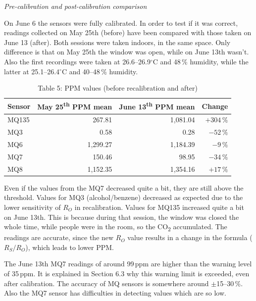 \textit{Pre-calibration and post-calibration comparison}

On June 6 the sensors were fully calibrated. In order to test if it was correct, readings
collected on May 25th (before) have been compared with those taken on June 13 (after). Both
sessions were taken indoors, in the same space. Only difference is that on May 25th the window
was open, while on June 13th wasn't. Also the first recordings were taken at 26.6--26.9$^\circ$C
and 48\,\% humidity, while the latter at 25.1--26.4$^\circ$C and 40--48\,\% humidity.

\vspace{12pt}
\begin{table}[H]
  \centering
  \caption{Table 5: PPM values (before recalibration and after)}
  \label{tab:calibration-compare}
  \renewcommand{\arraystretch}{1.3}
  \begin{tabular}{lrrr}
    \toprule
    \textbf{Sensor} & \textbf{May 25\textsuperscript{th} PPM mean} & \textbf{June 13\textsuperscript{th} PPM mean} & \textbf{Change} \\
    \midrule
    MQ135 &    267.81 & 1{,}081.04 & $+304\,\%$ \\
    MQ3   &      0.58 &      0.28  & $-52\,\%$  \\
    MQ6   & 1{,}299.27 & 1{,}184.39 & $-9\,\%$  \\
    MQ7   &    150.46 &     98.95  & $-34\,\%$  \\
    MQ8   & 1{,}152.35 & 1{,}354.16 & $+17\,\%$ \\
    \bottomrule
  \end{tabular}
\end{table}
\vspace{12pt}

Even if the values from the MQ7 decreased quite a bit, they are still above the threshold.
Values for MQ3 (alcohol/benzene) decreased as expected due to the lower sensitivity of $R_O$
in recalibration. Values for MQ135 increased quite a bit on June 13th. This is because during
that session, the window was closed the whole time, while people were in the room, so the
CO\textsubscript{2} accumulated. The readings are accurate, since the new $R_O$ value results
in a change in the formula ($R_S/R_O$), which leads to lower PPM.

The June 13th MQ7 readings of around 99\,ppm are higher than the warning level of 35\,ppm. It
is explained in Section 6.3 why this warning limit is exceeded, even after calibration. The
accuracy of MQ sensors is somewhere around $\pm$15--30\,\%. Also the MQ7 sensor has
difficulties in detecting values which are so low.

